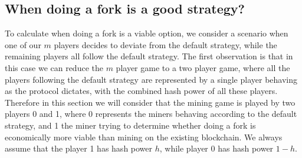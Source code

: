 %
%

\subsection{When doing a fork is a good strategy?}
\label{sec-forkingstrategies}

To calculate when doing a fork is a viable option, we consider a scenario when one of our $m$ players decides to deviate from the default strategy, while the remaining players all follow the default strategy. 
The first observation is that in this case we can reduce the $m$ player game to a two player game, where all the players following the default strategy are represented by a single player behaving as the protocol dictates, with the combined hash power of all these players. Therefore in this section we will consider that the mining game is played by two players 0 and 1, where 0 represents the miners behaving according to the default strategy, and 1 the miner trying to determine whether doing a fork is economically more viable than mining on the existing blockchain. We always assume that the player 1 has hash power $h$, while player 0 has hash power $1-h$.

